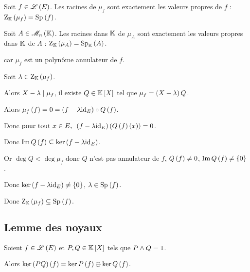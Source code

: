 \begin{prop}
Soit \(f\in\mathscr{L}\left(E\right)\). Les racines de \(\mu_f\) sont exactement les valeurs propres de \(f\) : \(\rac{\mu_f}=\Sp{f}\).

Soit \(A\in\M{n}\). Les racines dans \(\mathbb{K}\) de \(\mu_A\) sont exactement les valeurs propres dans \(\mathbb{K}\) de \(A\) : \(\rac{\mu_A}=\Sp[\K]{A}\).
\end{prop}

\begin{dem}
\increc \Cf {} car \(\mu_f\) est un polynôme annulateur de \(f\).

\incdir

Soit \(\lambda\in\rac{\mu_f}\).

Alors \(X-\lambda\mid\mu_f\), \ie il existe \(Q\in\poly\) tel que \(\mu_f=\left(X-\lambda\right)Q\).

Alors \(\mu_f\left(f\right)=0=\left(f-\lambda\mathrm{id}_{E}\right)\circ Q\left(f\right)\).

Donc \(\quantifs{\tpt x\in E}\paren{f-\lambda\id{E}}\paren{Q\paren{f}\paren{x}}=0\).

Donc \(\operatorname{Im} Q\left(f\right)\subseteq\ker\left(f-\lambda\mathrm{id}_{E}\right)\).

Or \(\deg Q<\deg\mu_f\) donc \(Q\) n'est pas annulateur de \(f\), \ie \(Q\left(f\right)\not=0\), \ie \(\operatorname{Im} Q\left(f\right)\not=\left\lbrace0\right\rbrace\).

Donc \(\ker\left(f-\lambda\mathrm{id}_{E}\right)\not=\left\lbrace0\right\rbrace\), \ie \(\lambda\in\Sp{f}\).

Donc \(\rac{\mu_f}\subset\Sp{f}\).
\end{dem}

\subsection{Lemme des noyaux}

\begin{prop}
Soient \(f\in\mathscr{L}\left(E\right)\) et \(P,Q\in\poly\) tels que \(P\land Q=1\).

Alors \(\ker\left(PQ\right)\left(f\right)=\ker P\left(f\right)\oplus\ker Q\left(f\right)\).
\end{prop}

